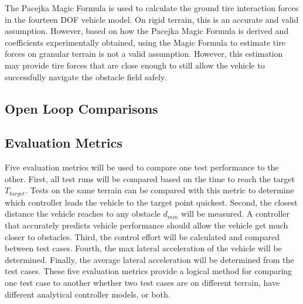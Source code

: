 \documentclass[12pt,twocolumn]{article}
\begin{document}
The Pacejka Magic Formula is used to calculate the ground tire interaction forces in the fourteen DOF vehicle model. On rigid terrain, this is an accurate and valid assumption. However, based on how the Pacejka Magic Formula is derived and coefficients experimentally obtained, using the Magic Formula to estimate tire forces on granular terrain is not a valid assumption. However, this estimation may provide tire forces that are close enough to still allow the vehicle to successfully navigate the obstacle field safely. 

\subsection{Open Loop Comparisons }\label{ss:OpenLoop}


\subsection{Evaluation Metrics}\label{ss:Metrics}
Five evaluation metrics will be used to compare one test performance to the other. First, all test runs will be compared based on the time to reach the target $T_{target}$. Tests on the same terrain can be compared with this metric to determine which controller leads the vehicle to the target point quickest. Second, the closest distance the vehicle reaches to any obstacle $d_{min}$ will be measured. A controller that accurately predicts vehicle performance should allow the vehicle get much closer to obstacles. Third, the control effort will be calculated and compared between test cases. Fourth, the max lateral acceleration of the vehicle will be determined. Finally, the average lateral acceleration will be determined from the test cases. These five evaluation metrics provide a logical method for comparing one test case to another whether two test cases are on different terrain, have different analytical controller models, or both. 

\end{document}

